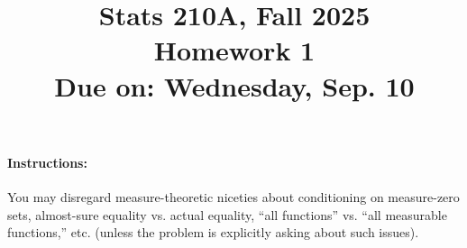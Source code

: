 \documentclass{article}
\theoremstyle{definition}
\begin{document}
\title{Stats 210A, Fall 2025\\
  Homework 1 \\
  {\large {\bf Due on}: Wednesday, Sep. 10}}
\date{}

\maketitle

\paragraph{Instructions:} You may disregard measure-theoretic niceties about conditioning on measure-zero sets, almost-sure equality vs. actual equality, ``all functions'' vs. ``all measurable functions,'' etc. (unless the problem is explicitly asking about such issues).
\end{document}
